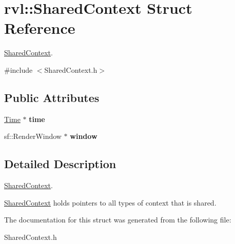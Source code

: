 \hypertarget{structrvl_1_1_shared_context}{}\section{rvl\+:\+:Shared\+Context Struct Reference}
\label{structrvl_1_1_shared_context}


\hyperlink{structrvl_1_1_shared_context}{Shared\+Context}.  




{\ttfamily \#include $<$Shared\+Context.\+h$>$}

\subsection*{Public Attributes}
\begin{DoxyCompactItemize}
\item 
\mbox{\label{structrvl_1_1_shared_context_aa7cc22c51d90b03ebb095f204d138795}} 
\hyperlink{classrvl_1_1_time}{Time} $\ast$ {\bfseries time}
\item 
\mbox{\label{structrvl_1_1_shared_context_a616231b97cd2354f155598b77d76508d}} 
sf\+::\+Render\+Window $\ast$ {\bfseries window}
\end{DoxyCompactItemize}


\subsection{Detailed Description}
\hyperlink{structrvl_1_1_shared_context}{Shared\+Context}. 

\hyperlink{structrvl_1_1_shared_context}{Shared\+Context} holds pointers to all types of context that is shared. 

The documentation for this struct was generated from the following file\+:\begin{DoxyCompactItemize}
\item 
Shared\+Context.\+h\end{DoxyCompactItemize}
